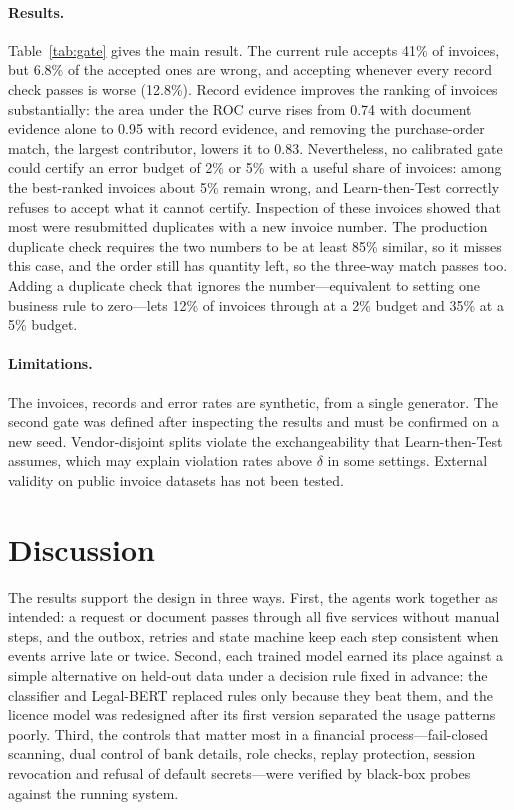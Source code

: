\paragraph{Results.} Table~\ref{tab:gate} gives the main result. The current rule accepts 41\% of invoices, but 6.8\% of the accepted ones are wrong, and accepting whenever every record check passes is worse (12.8\%). Record evidence improves the ranking of invoices substantially: the area under the ROC curve rises from 0.74 with document evidence alone to 0.95 with record evidence, and removing the purchase-order match, the largest contributor, lowers it to 0.83. Nevertheless, no calibrated gate could certify an error budget of 2\% or 5\% with a useful share of invoices: among the best-ranked invoices about 5\% remain wrong, and Learn-then-Test correctly refuses to accept what it cannot certify. Inspection of these invoices showed that most were resubmitted duplicates with a new invoice number. The production duplicate check requires the two numbers to be at least 85\% similar, so it misses this case, and the order still has quantity left, so the three-way match passes too. Adding a duplicate check that ignores the number---equivalent to setting one business rule to zero---lets 12\% of invoices through at a 2\% budget and 35\% at a 5\% budget.

\paragraph{Limitations.} The invoices, records and error rates are synthetic, from a single generator. The second gate was defined after inspecting the results and must be confirmed on a new seed. Vendor-disjoint splits violate the exchangeability that Learn-then-Test assumes, which may explain violation rates above $\delta$ in some settings. External validity on public invoice datasets has not been tested.

\section{Discussion}
The results support the design in three ways. First, the agents work together as intended: a request or document passes through all five services without manual steps, and the outbox, retries and state machine keep each step consistent when events arrive late or twice. Second, each trained model earned its place against a simple alternative on held-out data under a decision rule fixed in advance: the classifier and Legal-BERT replaced rules only because they beat them, and the licence model was redesigned after its first version separated the usage patterns poorly. Third, the controls that matter most in a financial process---fail-closed scanning, dual control of bank details, role checks, replay protection, session revocation and refusal of default secrets---were verified by black-box probes against the running system.

